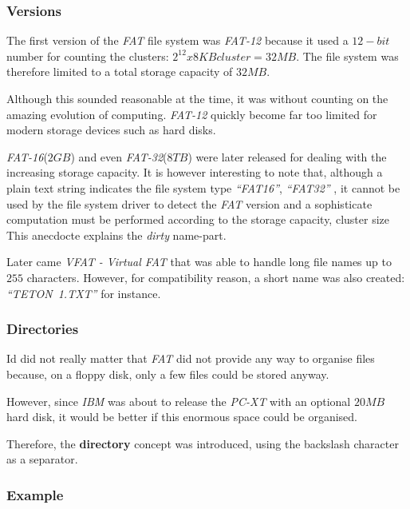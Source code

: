 \begin{frame}
  \frametitle{Versions}

  The first version of the \textit{FAT} file system was \textit{FAT-12}
  because it used a $12-bit$ number for counting the clusters: $2^{12} x
  8KB cluster = 32MB$. The file system was therefore limited to a total
  storage capacity of $32MB$.

  \-

  Although this sounded reasonable at the time, it was without counting on
  the amazing evolution of computing. \textit{FAT-12} quickly become
  far too limited for modern storage devices such as hard disks.

  \-

  \textit{FAT-16}($2 GB$) and even \textit{FAT-32}($8 TB$) were later released
  for dealing with the increasing storage capacity. It is however interesting
  to note that, although a plain text string indicates the file system type
  \textit{``FAT16''}, \textit{``FAT32''} \etc{}, it cannot be used by
  the file system driver to detect the \textit{FAT} version and a sophisticate
  computation must be performed according to the storage capacity, cluster
  size \etc{} This anecdocte explains the \textit{dirty} name-part.

  \-

  Later came \textit{VFAT - Virtual FAT} that was able to handle long
  file names up to $255$ characters. However, for compatibility reason, a
  short name was also created: \textit{``TETON~1.TXT''} for instance.
\end{frame}


\begin{frame}
  \frametitle{Directories}

  Id did not really matter that \textit{FAT} did not provide any way to
  organise files because, on a floppy disk, only a few files could be stored
  anyway.

  \-

  However, since \textit{IBM} was about to release the \textit{PC-XT} with
  an optional $20 MB$ hard disk, it would be better if this enormous space
  could be organised.

  \-

  Therefore, the \textbf{directory} concept was introduced, using the
  backslash character as a separator.
\end{frame}


\begin{frame}
  \frametitle{Example}

  \begin{center}
  \end{center}
\end{frame}

